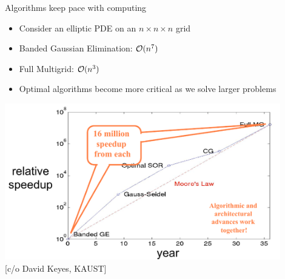 \documentclass{beamer}
\begin{document}
\begin{frame}{Algorithms keep pace with computing}
  \begin{itemize}
  \item Consider an elliptic PDE on an $n\times n \times n$ grid
  \item Banded Gaussian Elimination: $\mathcal{O}(n^7)$
  \item Full Multigrid: $\mathcal{O}(n^3)$
  \item Optimal algorithms become more critical as we solve larger problems
  \end{itemize}
  \includegraphics[width=0.9\textwidth]{figures/KeyesAlgorithmsKeepPace.png} \\
  {[c/o David Keyes, KAUST]}
\end{frame}



\end{document}
